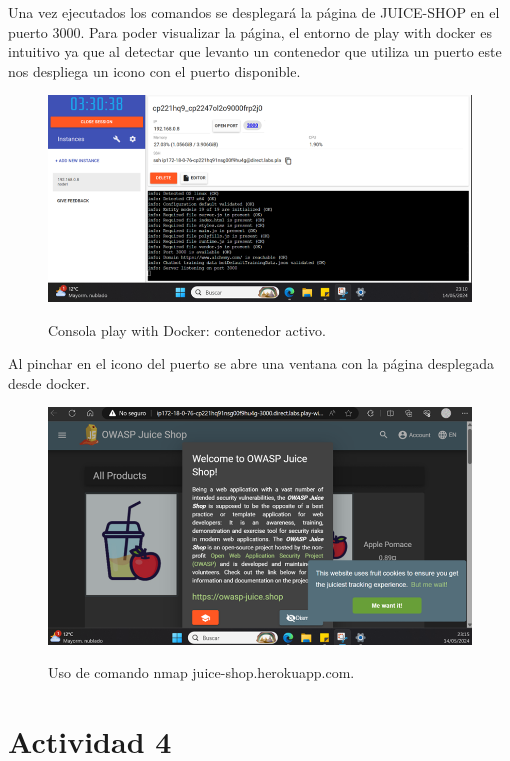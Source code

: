 \documentclass[stu, 11pt, letterpaper, donotrepeattitle, floatsintext, natbib]{apa7}
\begin{document}
Una vez ejecutados los comandos se desplegará la página de JUICE-SHOP en el puerto 3000. Para poder visualizar la página, el entorno de play with docker es intuitivo ya que al detectar que levanto un contenedor que utiliza un puerto este nos despliega un icono con el puerto disponible.

\begin{figure}[H]
    \centering
    \caption{Consola play with Docker: contenedor activo.}
    \includegraphics[width=0.75\linewidth]{docker5.png} %
    \label{fig:OverallEffect}
\end{figure}

Al pinchar en el icono del puerto se abre una ventana con la página desplegada desde docker.

\begin{figure}[H]
    \centering
    \caption{Uso de comando nmap juice-shop.herokuapp.com.}
    \includegraphics[width=0.75\linewidth]{docker6.png} %
    \label{fig:OverallEffect}
\end{figure}

\section{\large Actividad 4}
\end{document}
